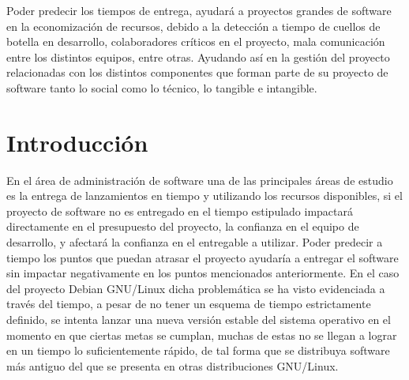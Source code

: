\documentclass[12pt]{report}
\begin{document}
Poder predecir los tiempos de  entrega, ayudará a proyectos grandes de
software  en la  economización de  recursos, debido  a la  detección a
tiempo de cuellos de botella  en desarrollo, colaboradores críticos en
el  proyecto, mala  comunicación  entre los  distintos equipos,  entre
otras. Ayudando  así en  la gestión del  proyecto relacionadas  con los
distintos  componentes que  forman parte  de su  proyecto de  software
tanto lo social como lo técnico, lo tangible e intangible.

\chapter*{Introducción} En  el área de administración  de software una
de las principales  áreas de estudio es la entrega  de lanzamientos en
tiempo  y  utilizando los  recursos  disponibles,  si el  proyecto  de
software   no  es   entregado  en   el  tiempo   estipulado  impactará
directamente en el presupuesto del proyecto, la confianza en el equipo
de  desarrollo,   y  afectará   la  confianza   en  el   entregable  a
utilizar. Poder  predecir a  tiempo los puntos  que puedan  atrasar el
proyecto ayudaría a entregar el software sin impactar negativamente en
los puntos mencionados  anteriormente. En el caso  del proyecto Debian
GNU/Linux  dicha problemática  se ha  visto evidenciada  a través  del
tiempo,  a  pesar de  no  tener  un  esquema de  tiempo  estrictamente
definido,  se intenta  lanzar una  nueva versión  estable del  sistema
operativo en  el momento en  que ciertas  metas se cumplan,  muchas de
estas no se llegan a lograr en un tiempo lo suficientemente rápido, de
tal forma que  se distribuya software más antiguo del  que se presenta
en otras distribuciones GNU/Linux.
\end{document}
